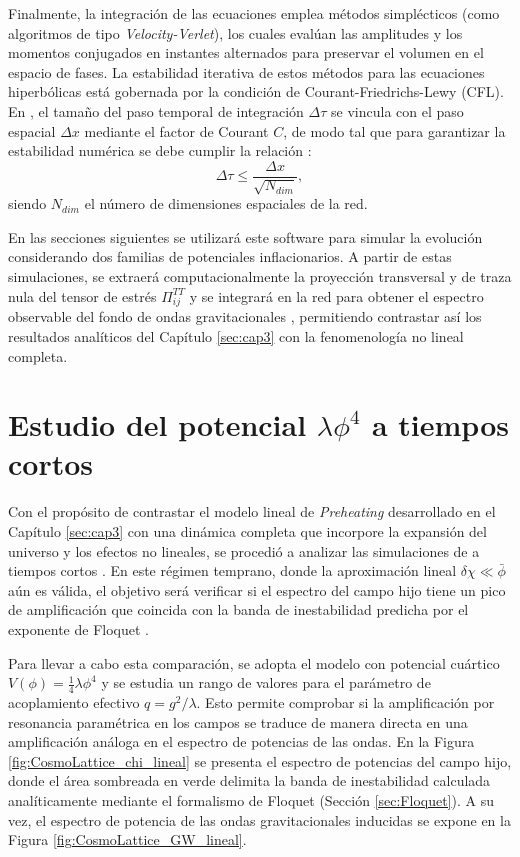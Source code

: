 Finalmente, la integración de las ecuaciones emplea métodos simplécticos (como algoritmos de tipo \textit{Velocity-Verlet}), los cuales evalúan las amplitudes y los momentos conjugados en instantes alternados para preservar el volumen en el espacio de fases. La estabilidad iterativa de estos métodos para las ecuaciones hiperbólicas está gobernada por la condición de Courant-Friedrichs-Lewy (CFL). En \CosmoLattice, el tamaño del paso temporal de integración $\Delta \tau$ se vincula con el paso espacial $\Delta x$ mediante el factor de Courant $C$, de modo tal que para garantizar la estabilidad numérica se debe cumplir la relación \cite{Figueroa2021}:
\begin{equation}
    \Delta \tau \leq \frac{\Delta x}{\sqrt{N_{dim}}},
\end{equation}
siendo $N_{dim}$ el número de dimensiones espaciales de la red.

En las secciones siguientes se utilizará este software para simular la evolución considerando dos familias de potenciales inflacionarios. A partir de estas simulaciones, se extraerá computacionalmente la proyección transversal y de traza nula del tensor de estrés $\Pi_{ij}^{TT}$ y se integrará en la red para obtener el espectro observable del fondo de ondas gravitacionales \cite{Dufaux_2007, Figueroa_2017_GW}, permitiendo contrastar así los resultados analíticos del Capítulo \ref{sec:cap3} con la fenomenología no lineal completa.

\section{Estudio del potencial \texorpdfstring{$\lambda \phi^4$}{lambda phi\textasciicircum 4} a tiempos cortos}

Con el propósito de contrastar el modelo lineal de \textit{Preheating} desarrollado en el Capítulo \ref{sec:cap3} con una dinámica completa que incorpore la expansión del universo y los efectos no lineales, se procedió a analizar las simulaciones de \CosmoLattice a tiempos cortos \cite{Figueroa2021, Figueroa2023}. En este régimen temprano, donde la aproximación lineal $\delta \chi \ll \bar{\phi}$ aún es válida, el objetivo será verificar si el espectro del campo hijo tiene un pico de amplificación que coincida con la banda de inestabilidad predicha por el exponente de Floquet \cite{Amin_2014, Kofman_1997}.

Para llevar a cabo esta comparación, se adopta el modelo con potencial cuártico $V(\phi) = \frac{1}{4} \lambda \phi^4$ y se estudia un rango de valores para el parámetro de acoplamiento efectivo $q = g^2/\lambda$. Esto permite comprobar si la amplificación por resonancia paramétrica en los campos se traduce de manera directa en una amplificación análoga en el espectro de potencias de las ondas. En la Figura \ref{fig:CosmoLattice_chi_lineal} se presenta el espectro de potencias del campo hijo, donde el área sombreada en verde delimita la banda de inestabilidad calculada analíticamente mediante el formalismo de Floquet (Sección \ref{sec:Floquet}). A su vez, el espectro de potencia de las ondas gravitacionales inducidas se expone en la Figura \ref{fig:CosmoLattice_GW_lineal}.

